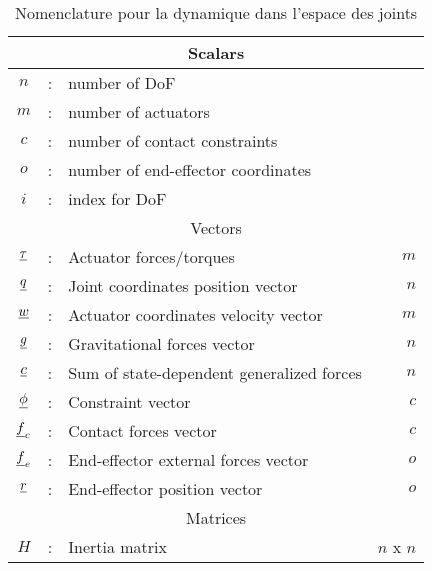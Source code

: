 \begin{table}[htbp]
	\centering
	\caption{Nomenclature pour la dynamique dans l'espace des joints}	%
		\begin{tabular}{ c c l r }
        \hline \hline
				\multicolumn{4}{c}{Scalars} \\
				\hline \hline
			$n$             &  :  & number of DoF                                              & \\
			$m$             &  :  & number of actuators                                        & \\
			$c$             &  :  & number of contact constraints                              & \\
			$o$             &  :  & number of end-effector coordinates                         & \\ 
			$i$             &  :  & index for DoF                                              & \\ 
			\hline \hline
			\multicolumn{4}{c}{Vectors} \\
			\hline \hline
			$\underline{\tau}$    &  :  & Actuator forces/torques                                    & $m$  \\
			$\underline{q}$       &  :  & Joint coordinates position vector                          & $n$  \\
			$\underline{w}$       &  :  & Actuator coordinates velocity vector                          & $m$  \\ 
			$\underline{g}$       &  :  & Gravitational forces vector                                & $n$  \\
			$\underline{c}$       &  :  & Sum of state-dependent generalized forces                  & $n$  \\
			$\underline{\phi}$    &  :  & Constraint vector                                          & $c$  \\
			$\underline{f}_c$     &  :  & Contact forces vector                                      & $c$  \\
			$\underline{f}_e$     &  :  & End-effector external forces vector                        & $o$  \\
			$\underline{r}$       &  :  & End-effector position vector                               & $o$  \\
			\hline \hline
			\multicolumn{4}{c}{Matrices} \\
			\hline \hline
			$H$             &  :  & Inertia matrix                                             & $n$ x $n$ \\

\end{tabular}
\end{table}

